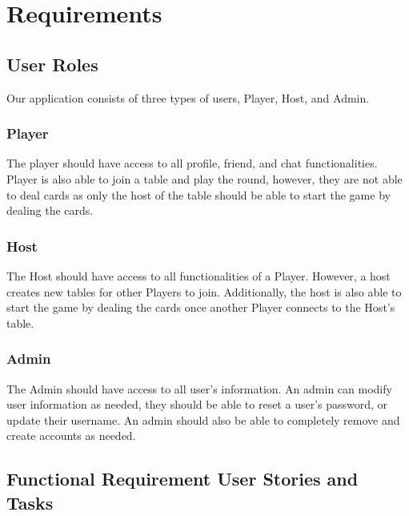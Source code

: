 \section{Requirements}


\subsection{User Roles}


Our application consists of three types of users, Player, Host, and Admin. 


\subsubsection{Player}
The player should have access to all profile, friend, and chat functionalities.
Player is also able to join a table and play the round, however, they are not able to deal cards as only the host of the table should be able to start the game by dealing the cards. 

\subsubsection{Host}
The Host should have access to all functionalities of a Player. However, a host creates new tables for other Players to join. Additionally, the host is also able to start the game by dealing the cards once another Player connects to the Host's table. 

\subsubsection{Admin}
The Admin should have access to all user's information. An admin can modify user information as needed, they should be able to reset a user's password, or update their username. An admin should also be able to completely remove and create accounts as needed. 


\subsection{Functional Requirement User Stories and Tasks}



